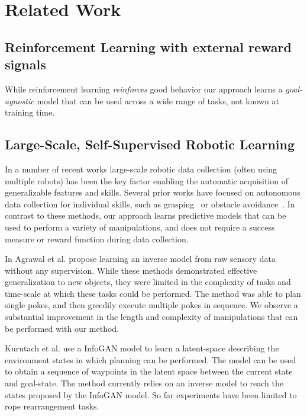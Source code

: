 \section{Related Work}\label{sec:rel_work}

\subsection{Reinforcement Learning with external reward signals}
While reinforcement learning \emph{reinforces} good behavior our approach learns a \emph{goal-agnostic} model that can be used across a wide range of tasks, not known at training time.

\subsection{Large-Scale, Self-Supervised Robotic Learning}

In a number of recent works large-scale robotic data collection (often using multiple robots) has been the key factor enabling the automatic acquisition of generalizable features and skills. Several prior works have focused on autonomous data collection for individual skills, such as grasping~\cite{lerrel,google_handeye} or obstacle avoidance~\cite{greg_kahn_uncertainty,crashing}. In contrast to these methods, our approach learns predictive models that can be used to perform a variety of manipulations, and does not require a success measure or reward function during data collection. 

In \cite{pulkit} Agrawal et al. propose learning an inverse model from raw sensory data without any supervision. While these methods demonstrated effective generalization to new objects, they were limited in the complexity of tasks and time-scale at which these tasks could be performed. The method was able to plan single pokes, and then greedily execute multiple pokes in sequence. We observe a substantial improvement in the length and complexity of manipulations that can be performed with our method.

Kurutach et al. use a InfoGAN model \cite{kurutach2018learning} to learn a latent-space describing the environment states in which planning can be performed. The model can be used to obtain a sequence of waypoints in the latent space between the current state and goal-state. The method currently relies on an inverse model to reach the states proposed by the InfoGAN model. So far experiments have been limited to rope rearrangement tasks.

